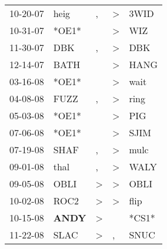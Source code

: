 \begin{supertabular}{p{0.07\textwidth}p{0.06\textwidth}p{0.02\textwidth}p{0.02\textwidth}p{0.06\textwidth}}
          10-20-07\textsuperscript{} &           heig\textsuperscript{} &                , &     \textgreater &           3WID\textsuperscript{} \\
          10-31-07\textsuperscript{} &                            *OE1* &                  &     \textgreater &            WIZ\textsuperscript{} \\
          11-30-07\textsuperscript{} &            DBK\textsuperscript{} &                , &     \textgreater &            DBK\textsuperscript{} \\
          12-14-07\textsuperscript{} &           BATH\textsuperscript{} &                  &     \textgreater &           HANG\textsuperscript{} \\
          03-16-08\textsuperscript{} &                            *OE1* &                  &     \textgreater &           wait\textsuperscript{} \\
          04-08-08\textsuperscript{} &           FUZZ\textsuperscript{} &                , &     \textgreater &           ring\textsuperscript{} \\
          05-03-08\textsuperscript{} &                            *OE1* &                  &     \textgreater &            PIG\textsuperscript{} \\
          07-06-08\textsuperscript{} &                            *OE1* &                  &     \textgreater &           SJIM\textsuperscript{} \\
          07-19-08\textsuperscript{} &           SHAF\textsuperscript{} &                , &     \textgreater &           mulc\textsuperscript{} \\
          09-01-08\textsuperscript{} &           thal\textsuperscript{} &                , &     \textgreater &           WALY\textsuperscript{} \\
          09-05-08\textsuperscript{} &           OBLI\textsuperscript{} &     \textgreater &     \textgreater &           OBLI\textsuperscript{} \\
          10-02-08\textsuperscript{} &           ROC2\textsuperscript{} &     \textgreater &     \textgreater &           flip\textsuperscript{} \\
          10-15-08\textsuperscript{} &  \textbf{ANDY\textsuperscript{}} &     \textgreater &                  &                            *CS1* \\
          11-22-08\textsuperscript{} &           SLAC\textsuperscript{} &     \textgreater &                , &           SNUC\textsuperscript{} \\

\end{supertabular}
